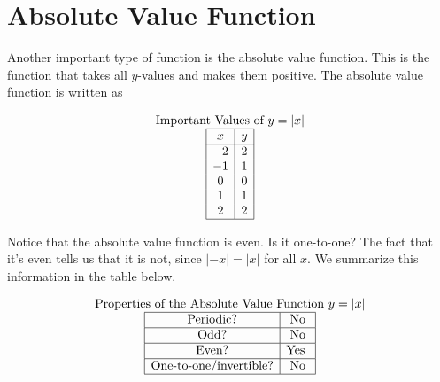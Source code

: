 \documentclass[nooutcomes]{ximera}
\begin{document}
\newpage


\section{Absolute Value Function}
Another important type of function is the absolute value function.  This is the function that takes all $y$-values and makes them positive.  The absolute value function is written as 

\begin{center}
\end{center}

\begin{center}
\end{center}

\[
\begin{array}{c }
\text{\normalfont Important Values of $y=|x|$} \\
\begin{array}{|c|c|}
 \hline
 x & y\\
 \hline
 -2&2\\ 
-1&1\\ 
0&0\\
 1&1\\
 2&2\\
 \hline
\end{array}
\end{array}
\]

Notice that the absolute value function is even. Is it one-to-one? The fact that it's even tells us that it is not, since $|-x| = |x|$ for all $x$. We summarize this information in the table below.

\[
\begin{array}{c }
\text{\normalfont Properties of the Absolute Value Function } y=|x| \\
\begin{array}{|c|c|}
 \hline
\text{Periodic?} & \text{No} \\ \hline
\text{Odd?} & \text{No} \\ \hline
\text{Even?} & \text{Yes } \\ \hline
\text{One-to-one/invertible?} & \text{No}\\ \hline
\end{array}
\end{array}
\]
\end{document}
